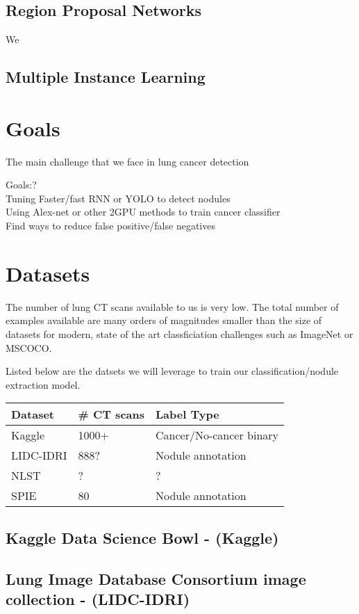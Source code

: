 \documentclass[twocolumn,10pt]{article}
\newcommand{\red}[1]{{\color{red}#1}}
\newcommand{\temp}[1]{{\red{#1}\\}}
\begin{document}
\subsection{Region Proposal Networks}
We 
\subsection{Multiple Instance Learning}

\section{Goals}

The main challenge that we face in lung cancer detection 

\temp{Goals:?}
\temp{Tuning Faster/fast RNN or YOLO to detect nodules}
\temp{Using Alex-net or other 2GPU methods to train cancer classifier}
\temp{Find ways to reduce false positive/false negatives}

\section{Datasets}
The number of lung CT scans available to us is very low. The total number of examples
available are many orders of magnitudes smaller than the size of datasets for modern,
state of the art classficiation challenges such as ImageNet or MSCOCO. 

Listed below are the datsets we will leverage to train our classification/nodule
extraction model.

\begin{center}
\begin{tabular}{lll}
  \toprule
  Dataset & \# CT scans & Label Type\\
  \midrule
  Kaggle&1000+&Cancer/No-cancer binary\\
  LIDC-IDRI&888?&Nodule annotation\\
  NLST&?&?\\
  SPIE&80&Nodule annotation\\
\end{tabular}
\end{center}

\subsection{Kaggle Data Science Bowl - (Kaggle)}
\subsection{Lung Image Database Consortium image collection - (LIDC-IDRI)}
\end{document}
